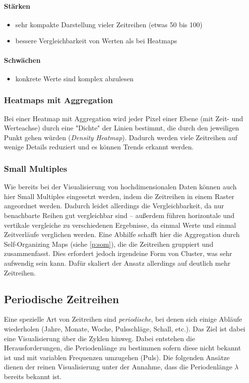 \paragraph{Stärken}
	\begin{itemize}
		\item sehr kompakte Darstellung vieler Zeitreihen (etwas 50 bis 100)
		\item bessere Vergleichbarkeit von Werten als bei Heatmaps
	\end{itemize}

	\paragraph{Schwächen}
		\begin{itemize}
			\item konkrete Werte sind komplex abzulesen
		\end{itemize}

	\subsubsection{Heatmaps mit Aggregation}
		Bei einer Heatmap mit Aggregation wird jeder Pixel einer Ebene (mit Zeit- und Werteachse) durch eine "Dichte" der Linien bestimmt, die durch den jeweiligen Punkt gehen würden (\emph{Density Heatmap}). Dadurch werden viele Zeitreihen auf wenige Details reduziert und es können Trends erkannt werden.

	\subsubsection{Small Multiples}
		Wie bereits bei der Visualisierung von hochdimensionalen Daten können auch hier Small Multiples eingesetzt werden, indem die Zeitreihen in einem Raster angeordnet werden. Dadurch leidet allerdings die Vergleichbarkeit, da nur benachbarte Reihen gut vergleichbar sind -- außerdem führen horizontale und vertikale vergleiche zu verschiedenen Ergebnisse, da einmal Werte und einmal Zeitverläufe verglichen werden. Eine Abhilfe schafft hier die Aggregation durch Self-Organizing Maps (siehe \autoref{p:som}), die die Zeitreihen gruppiert und zusammenfasst. Dies erfordert jedoch irgendeine Form von Cluster, was sehr aufwendig sein kann. Dafür skaliert der Ansatz allerdings auf deutlich mehr Zeitreihen.

\subsection{Periodische Zeitreihen}
Eine spezielle Art von Zeitreihen sind \emph{periodische}, bei denen sich einige Abläufe wiederholen (\zB Jahre, Monate, Woche, Pulsschläge, Schall, etc.). Das Ziel ist dabei eine Visualisierung über die Zyklen hinweg. Dabei entstehen die Herausforderungen, die Periodenlänge zu bestimmen sofern diese nicht bekannt ist und mit variablen Frequenzen umzugehen (\bspw Puls). Die folgenden Ansätze dienen der reinen Visualisierung unter der Annahme, dass die Periodenlänge \(\lambda\) bereits bekannt ist.

